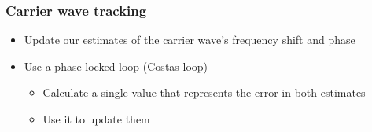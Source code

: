 \documentclass[aspectratio=169]{beamer}
\begin{document}
\begin{frame}
    \frametitle{Carrier wave tracking}

    \begin{itemize}
        \item Update our estimates of the carrier wave's frequency shift and phase
        
        \item<2-> Use a phase-locked loop (Costas loop)
        
        \begin{itemize}
            \item<3-> Calculate a single value that represents the error in both estimates

            \item<4-> Use it to update them
        \end{itemize}
    \end{itemize}
\end{frame}
\end{document}
